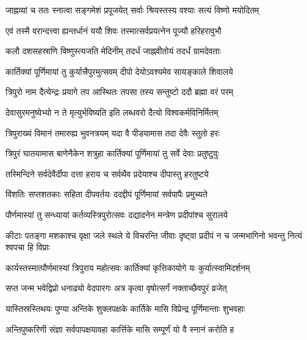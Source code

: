 \twolineshloka
{जाह्नव्यां च ततः स्नात्वा सङ्गमेशं प्रपूजयेत्}
{सर्वाः श्रियस्तस्य वश्याः सत्यं विष्णो मयोदितम्} %

\twolineshloka
{एवं तस्मै वरान्दत्त्वा ह्यन्तर्धानं ययौ शिवः}
{तस्मात्सर्वप्रयत्नेन पूज्यौ हरिहरावुभौ} %

\twolineshloka
{कलौ दशसहस्राणि विष्णुस्त्यजति मेदिनीम्}
{तदर्धं जाह्नवीतोयं तदर्धं ग्रामदेवताः} %

\twolineshloka
{कार्तिक्यां पूर्णिमायां तु कुर्यात्त्रैपुरमुत्सवम्}
{दीपो देयोऽवश्यमेव सायङ्काले शिवालये} %

\twolineshloka
{त्रिपुरो नाम दैत्येन्द्रः प्रयागे तप आस्थितः}
{तपसा तस्य सन्तुष्टो ददौ ब्रह्मा वरं परम्} %

\twolineshloka
{देवासुरमनुष्येभ्यो न ते मृत्युर्भविष्यति}
{इति लब्धवरो दैत्यो विश्वकर्मविनिर्मितम्} %

\twolineshloka
{त्रिपुराख्यं विमानं तमारुह्य भुवनत्रयम्}
{यदा वै पीडयामास तदा देवैः स्तुतो हरः} %

\twolineshloka
{त्रिपुरं घातयामास बाणेनैकेन शत्रुहा}
{कार्तिक्यां पूर्णिमायां तु सर्वे देवाः प्रतुष्टुवुः} %

\twolineshloka
{तस्मिन्दिने सर्वदेवैर्दीपा दत्ता हराय च}
{सर्वथैव प्रदेयाश्च दीपास्तु हरतुष्टये} %

\twolineshloka
{विंशतिः सप्तशतकाः सहिता दीपवर्तयः}
{ददद्दीपं पूर्णिमायां सर्वपापैः प्रमुच्यते} %

\twolineshloka
{पौर्णमास्यां तु सन्ध्यायां कर्तव्यस्त्रिपुरोत्सवः}
{दद्यादनेन मन्त्रेण प्रदीपांश्च सुरालये} %

\twolineshloka
{कीटाः पतङ्गा मशकाश्च वृक्षा जले स्थले ये विचरन्ति जीवाः}
{दृष्ट्वा प्रदीपं न च जन्मभागिनो भवन्तु नित्यं श्वपचा हि विप्राः} %

\twolineshloka
{कार्यस्तस्मात्पौर्णमास्यां त्रिपुराय महोत्सवः}
{कार्तिक्यां कृत्तिकायोगे यः कुर्यात्स्वामिदर्शनम्} %

\twolineshloka
{सप्त जन्म भवेद्विप्रो धनाढ्यो वेदपारगः}
{अत्र कृत्वा वृषोत्सर्गं नक्ताच्छैवपुरं व्रजेत्} %





\twolineshloka
{यास्तिस्रस्तिथयः पुण्या अन्तिके शुक्लपक्षके}
{कार्तिके मासि विप्रेन्द्र पूर्णिमान्ताः शुभवहाः} %

\twolineshloka
{अन्तिपुष्करिणी संज्ञा सर्वपापक्षयावहा}
{कार्त्तिके मासि सम्पूर्णं यो वै स्नानं करोति ह} %

